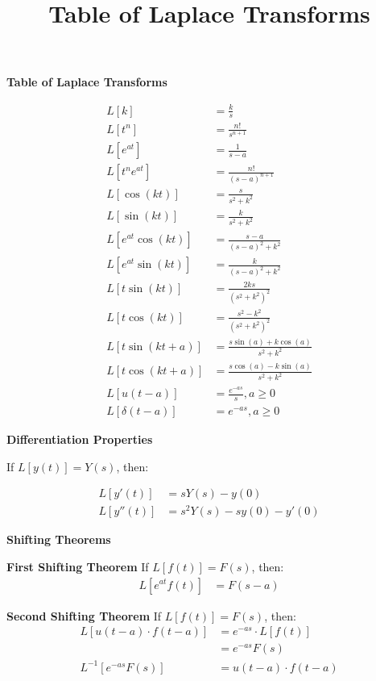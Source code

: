 \documentclass[10pt]{article}
\title{Table of Laplace Transforms}
\begin{document}
\textbf{Table of Laplace Transforms}

\begin{align}
    L[k] &= \frac{k}{s} \\
    L[t^n] &= \frac{n!}{s^{n+1}} \\
    L[e^{at}] &= \frac{1}{s - a}\\
    L[t^n e^{at}] &= \frac{n!}{(s-a)^{n+1}} \\
    L[\cos(kt)] &= \frac{s}{s^2 + k^2} \\
    L[\sin(kt)] &= \frac{k}{s^2 + k^2} \\
    L[e^{at} \cos(kt)] &= \frac{s - a}{(s - a)^2 + k^2} \\
    L[e^{at} \sin(kt)] &= \frac{k}{(s - a)^2 + k^2} \\
    L[t \sin(kt)] &= \frac{2ks}{(s^2 + k^2)^2} \\
    L[t \cos(kt)] &= \frac{s^2 - k^2}{(s^2 + k^2)^2}\\
    L[t \sin(kt+a)] &= \frac{s\sin(a) + k \cos(a)}{s^2 + k^2} \\
    L[t \cos(kt + a)] &= \frac{s \cos(a) - k \sin(a)}{s^2 + k^2} \\
    L[u(t-a)] &= \frac{e^{-as}}{s}, a \geq 0 \\
    L[\delta(t-a)] &= e^{-as}, a \geq 0 
\end{align}

\textbf{Differentiation Properties}

If \( L[y(t)] = Y(s) \), then:

\begin{align}
    L[y'(t)] &= sY(s) - y(0) \\
    L[y''(t)] &= s^2 Y(s) - sy(0) - y'(0)
\end{align}

\textbf{Shifting Theorems}

\textbf{First Shifting Theorem}
If \( L[f(t)] = F(s) \), then:
\begin{align}
    L[e^{at} f(t)] &= F(s - a)
\end{align}


\textbf{Second Shifting Theorem}
If \( L[f(t)] = F(s) \), then:
\begin{align}
    L[u(t - a) \cdot f(t - a)] &= e^{-as} \cdot L[f(t)] \\ 
                                &= e^{-as} F(s) \\
    L^{-1}[e^{-as} F(s)] &= u(t - a) \cdot f(t - a)
\end{align}
\end{document}

